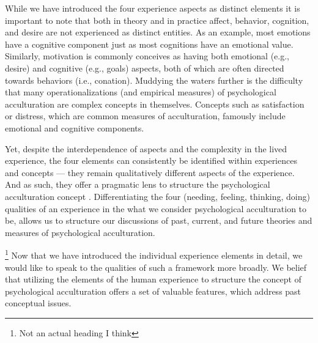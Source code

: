 \documentclass[nobib]{tufte-handout}
\begin{document}
While we have introduced the four experience aspects as distinct elements it is important to note that both in theory and in practice affect, behavior, cognition, and desire are not experienced as distinct entities. As an example, most emotions have a cognitive component just as most cognitions have an emotional value. Similarly, motivation is commonly conceives as having both emotional (e.g., desire) and cognitive (e.g., goals) aspects, both of which are often directed towards behaviors (i.e., conation). Muddying the waters further is the difficulty that many operationalizations (and empirical measures) of psychological acculturation are complex concepts in themselves. Concepts such as satisfaction or distress, which are common measures of acculturation, famously include emotional and cognitive components. 

Yet, despite the interdependence of aspects and the complexity in the lived experience, the four elements can consistently be identified within experiences and concepts --- they remain qualitatively different aspects of the experience. And as such, they offer a pragmatic lens to structure the psychological acculturation concept \citep{Kuhn1962}. Differentiating the four (needing, feeling, thinking, doing) qualities of an experience in the what we consider psychological acculturation to be, allows us to structure our discussions of past, current, and future theories and measures of psychological acculturation.

\footnote{Not an actual heading I think} 
Now that we have introduced the individual experience elements in detail, we would like to speak to the qualities of such a framework more broadly. We belief that utilizing the elements of the human experience to structure the concept of psychological acculturation offers a set of valuable features, which address past conceptual issues. 
\end{document}
